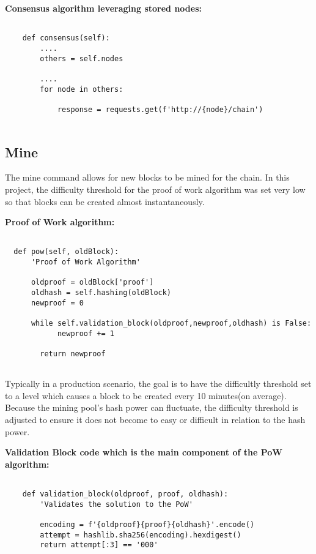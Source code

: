 \bigskip
\noindent
\textbf{Consensus algorithm leveraging stored nodes:}
\begin{footnotesize}
\begin{verbatim}

    def consensus(self):
        ....
        others = self.nodes
        
        ....
        for node in others:

            response = requests.get(f'http://{node}/chain')
        
\end{verbatim}
\end{footnotesize}

\subsection{Mine}

The mine command allows for new blocks to be mined for the chain. In
this project, the difficulty threshold for the proof of work algorithm
was set very low so that blocks can be created almost instantaneously.

\bigskip
\noindent
\textbf{Proof of Work algorithm:}
\begin{footnotesize}
\begin{verbatim}

  def pow(self, oldBlock):
      'Proof of Work Algorithm'

      oldproof = oldBlock['proof']
      oldhash = self.hashing(oldBlock)
      newproof = 0

      while self.validation_block(oldproof,newproof,oldhash) is False:
            newproof += 1

        return newproof
        
\end{verbatim}
\end{footnotesize}

Typically in a production scenario, the goal is to have the
difficultly threshold set to a level which causes a block to be
created every 10 minutes(on average). Because the mining pool's hash
power can fluctuate, the difficulty threshold is adjusted to ensure it
does not become to easy or difficult in relation to the hash
power.~\cite{hid-sp18-414-www-pow-vs-pos}

\bigskip
\noindent
\textbf{Validation Block code which is the main component of the PoW algorithm:}
\begin{footnotesize}
\begin{verbatim}

    def validation_block(oldproof, proof, oldhash):
        'Validates the solution to the PoW'

        encoding = f'{oldproof}{proof}{oldhash}'.encode()
        attempt = hashlib.sha256(encoding).hexdigest()
        return attempt[:3] == '000'

        
\end{verbatim}
\end{footnotesize}

